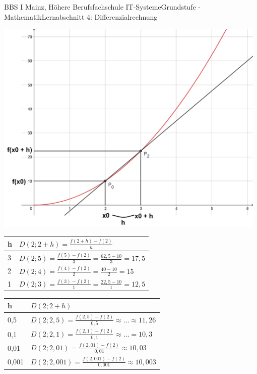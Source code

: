 \documentclass[11pt,twocolumn,oneside,openany,headings=optiontotoc,11pt,numbers=noenddot,final]{article}
\begin{document}
\begin{worksheet}{BBS I Mainz, Höhere Berufsfachschule IT-Systeme}{Grundstufe - Mathematik}{Lernabschnitt 4: Differenzialrechnung}
\begin{minipage}{0.22\textwidth}
		\end{minipage}
		\hfill
		\begin{minipage}{0.22\textwidth}
			\includegraphics[width=0.98\textwidth]{../99_Bilder/04_Skr_DiffQuo_3.jpg}
		\end{minipage}
		\par\noindent
		\renewcommand{\arraystretch}{1.5}
		\begin{tabularx}{0.48\textwidth}{l|X}
			h & \(D(2;2+h) = \frac{f(2+h)-f(2)}{h}\)\\
			\hline
			\hline
			3 & \(D(2;5) = \frac{f(5) - f(2)}{3} = \frac{62,5 - 10}{3} = 17,5\)\\
			\hline
			2 & \(D(2;4) = \frac{f(4) - f(2)}{2} = \frac{40 - 10}{2} = 15\)\\
			\hline
			1 & \(D(2;3) = \frac{f(3) - f(2)}{1} = \frac{22,5 - 10}{1} = 12,5\)\\
		\end{tabularx}
		\begin{tabularx}{0.48\textwidth}{l|X}
			h & \(D(2;2 + h)\)\\
			\hline
			\hline
			0,5 & \(D(2;2,5) = \frac{f(2,5) - f(2)}{0,5} \approx \ldots \approx 11,26\)\\
			\hline
			0,1 & \(D(2;2,1) = \frac{f(2,1) - f(2)}{0,1} \approx \ldots = 10,3\)\\
			\hline
			0,01 & \(D(2;2,01) = \frac{f(2,01) - f(2)}{0,01} \approx 10,03\)\\
			\hline
			0,001 & \(D(2;2,001) = \frac{f(2,001) - f(2)}{0,001} \approx 10,003\)\\
		\end{tabularx}

\end{worksheet}
\end{document}
